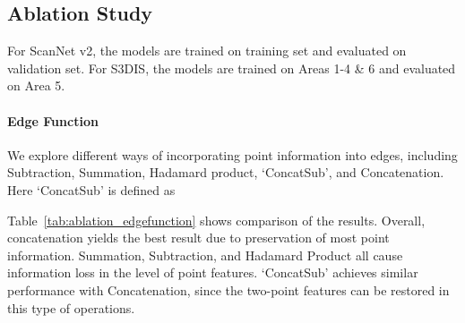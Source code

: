 \documentclass[10pt,twocolumn,letterpaper]{article}
\begin{document}
\subsection{Ablation Study}
For ScanNet v2, the models are trained on training set and evaluated on validation set. For S3DIS, the models are trained on Areas 1-4 \& 6 and evaluated on Area 5.   

\vspace{-3mm}
\paragraph{Edge Function}
We explore different ways of incorporating point information into edges, including Subtraction, Summation, Hadamard product, `ConcatSub', and Concatenation. Here `ConcatSub' is defined as 

Table~\ref{tab:ablation_edgefunction} shows comparison of the results.
Overall, concatenation yields the best result due to preservation of most point information.
Summation, Subtraction, and Hadamard Product all cause information loss in the level of point features. `ConcatSub' achieves similar performance with Concatenation, since the two-point features can be restored in this type of operations.

\begin{table}
	\setlength{\tabcolsep}{7pt}
	\begin{center}
	\end{center}
	\caption{Ablation study results for edge function  on ScanNet v2 and S3DIS. The results are shown in format of ScanNet v2 / S3DIS. The ablation on two datasets share similar observation.\vspace{2mm}}
	\label{tab:ablation_edgefunction}
\end{table}
\end{document}
